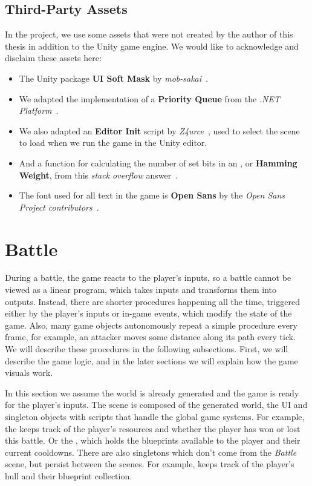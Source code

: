 \subsection{Third-Party Assets}
In the project, we use some assets that were not created by the author of this thesis in addition to the Unity game engine.
We would like to acknowledge and disclaim these assets here:
\begin{itemize}
    \item The Unity package \textbf{UI Soft Mask} by \emph{mob-sakai}~\cite{SoftMask}.
    \item We adapted the implementation of a \textbf{Priority Queue} from the \emph{.NET Platform}~\cite{PriorityQueue}.
    \item We also adapted an \textbf{Editor Init} script by \emph{Z4urce}~\cite{EditorInit}, used to select the scene to load when we run the game in the Unity editor.
    \item And a function for calculating the number of set bits in an , or \textbf{Hamming Weight}, from this \emph{stack overflow} answer~\cite{PopCount}.
    \item The font used for all text in the game is \textbf{Open Sans} by the \emph{Open Sans Project contributors}~\cite{OpenSans}.
\end{itemize}

\section{Battle}\label{sec:docs-battle}

During a battle, the game reacts to the player's inputs, so a battle cannot be viewed as a linear program, which takes inputs and transforms them into outputs.
Instead, there are shorter procedures happening all the time, triggered either by the player's inputs or in-game events, which modify the state of the game.
Also, many game objects autonomously repeat a simple procedure every frame, for example, an attacker moves some distance along its path every tick.
We will describe these procedures in the following subsections.
First, we will describe the game logic, and in the later sections we will explain how the game visuals work.

In this section we assume the world is already generated and the game is ready for the player's inputs.
The scene is composed of the generated world, the UI and singleton objects with scripts that handle the global game systems.
For example, the  keeps track of the player's resources and whether the player has won or lost this battle.
Or the , which holds the blueprints available to the player and their current cooldowns.
There are also singletons which don't come from the \emph{Battle} scene, but persist between the scenes.
For example,  keeps track of the player's hull and their blueprint collection.

